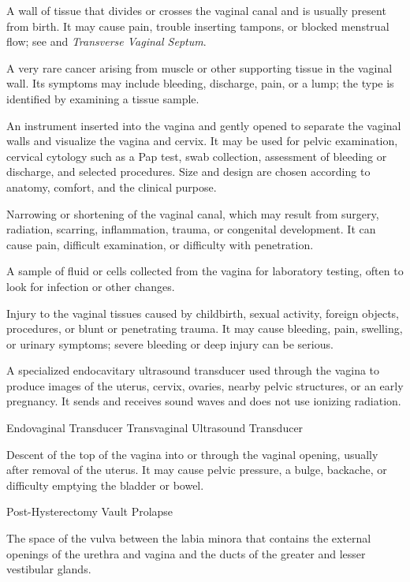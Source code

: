  A wall of tissue that divides or crosses the vaginal canal and is usually present from birth. It may cause pain, trouble inserting tampons, or blocked menstrual flow; see  and \textit{Transverse Vaginal Septum}.

 A very rare cancer arising from muscle or other supporting tissue in the vaginal wall. Its symptoms may include bleeding, discharge, pain, or a lump; the type is identified by examining a tissue sample.

 An instrument inserted into the vagina and gently opened to separate the vaginal walls and visualize the vagina and cervix. It may be used for pelvic examination, cervical cytology such as a Pap test, swab collection, assessment of bleeding or discharge, and selected procedures. Size and design are chosen according to anatomy, comfort, and the clinical purpose.

 Narrowing or shortening of the vaginal canal, which may result from surgery, radiation, scarring, inflammation, trauma, or congenital development. It can cause pain, difficult examination, or difficulty with penetration.

 A sample of fluid or cells collected from the vagina for laboratory testing, often to look for infection or other changes.

 Injury to the vaginal tissues caused by childbirth, sexual activity, foreign objects, procedures, or blunt or penetrating trauma. It may cause bleeding, pain, swelling, or urinary symptoms; severe bleeding or deep injury can be serious.

 A specialized endocavitary ultrasound transducer used through the vagina to produce images of the uterus, cervix, ovaries, nearby pelvic structures, or an early pregnancy. It sends and receives sound waves and does not use ionizing radiation.

\synonyms
Endovaginal Transducer
Transvaginal Ultrasound Transducer

 Descent of the top of the vagina into or through the vaginal opening, usually after removal of the uterus. It may cause pelvic pressure, a bulge, backache, or difficulty emptying the bladder or bowel.

\synonyms
Post-Hysterectomy Vault Prolapse

 The space of the vulva between the labia minora that contains the external openings of the urethra and vagina and the ducts of the greater and lesser vestibular glands.

